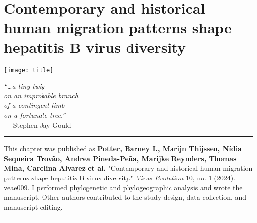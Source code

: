 \chapter{Contemporary and historical human migration patterns shape hepatitis B virus diversity}\label{ch:chapter3}

\begin{minipage}[b]{0.6\textwidth}
    \texttt{[image: title]} %
  \end{minipage}
  \hfill
  \begin{minipage}[b]{0.35\textwidth}
    \footnotesize
    \begin{flushright}
      \textit{``\ldots a tiny twig\\on an improbable branch\\of a contingent limb\\on a fortunate tree.''} \\
      --- Stephen Jay Gould
    \end{flushright}
    \vspace{2cm}
  \end{minipage}

\clearpage

\hrule
\vspace*{12pt}
This chapter was published as \textbf{Potter, Barney I., Marijn Thijssen, Nídia Sequeira Trovão, Andrea Pineda-Peña, Marijke Reynders, Thomas Mina, Carolina Alvarez et al.} "Contemporary and historical human migration patterns shape hepatitis B virus diversity." \textit{Virus Evolution} 10, no. 1 (2024): veae009. I performed phylogenetic and phylogeographic analysis and wrote the manuscript. Other authors contributed to the study design, data collection, and manuscript editing.
\vspace*{12pt}
\hrule

